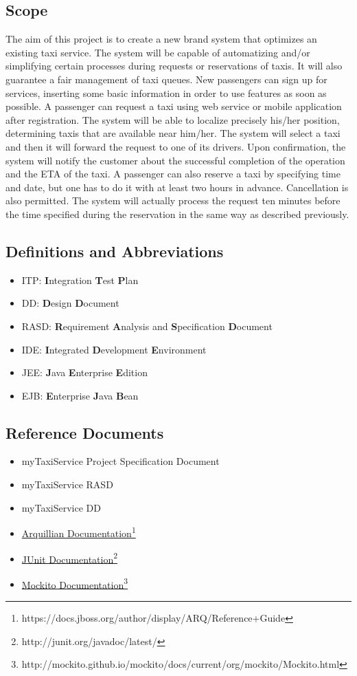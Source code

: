 \subsection{Scope}
The aim of this project is to create a new brand system that optimizes an 
existing taxi service.
The system will be capable of automatizing and/or simplifying certain 
processes during requests or reservations of taxis.
It will also guarantee a fair management of taxi queues.
New passengers can sign up for services, inserting some basic information in order to use features as soon as possible.
A passenger can request a taxi using web service or mobile
application after registration. The system will be able to localize precisely his/her position, determining taxis that are available near
him/her. The system will select a taxi and then it will forward the request to one of its drivers.
Upon confirmation, the system will notify the customer about the successful completion of the operation and the ETA of the taxi. A passenger can also reserve a taxi by specifying time and date, but one has to do it with at least two hours in advance. Cancellation is also permitted. The system will actually process the request ten minutes before the time specified during the reservation in the same way as described previously.
\subsection{Definitions and Abbreviations}
\begin{itemize}
	\item ITP: \textbf{I}ntegration \textbf{T}est \textbf{P}lan
	\item DD: \textbf{D}esign \textbf{D}ocument
	\item RASD: \textbf{R}equirement \textbf{A}nalysis and \textbf{S}pecification \textbf{D}ocument
	\item IDE: \textbf{I}ntegrated \textbf{D}evelopment \textbf{E}nvironment
	\item JEE: \textbf{J}ava \textbf{E}nterprise \textbf{E}dition
	\item EJB: \textbf{E}nterprise \textbf{J}ava \textbf{B}ean
\end{itemize}
\subsection{Reference Documents}
\begin{itemize}
	\item myTaxiService Project Specification Document
	\item myTaxiService RASD
	\item myTaxiService DD
	\item \href{https://docs.jboss.org/author/display/ARQ/Reference+Guide}{Arquillian Documentation}\footnote{https://docs.jboss.org/author/display/ARQ/Reference+Guide}
	\item \href{http://junit.org/javadoc/latest/}{JUnit Documentation}\footnote{http://junit.org/javadoc/latest/}
	\item \href{http://mockito.github.io/mockito/docs/current/org/mockito/Mockito.html}{Mockito Documentation}\footnote{http://mockito.github.io/mockito/docs/current/org/mockito/Mockito.html}
\end{itemize}